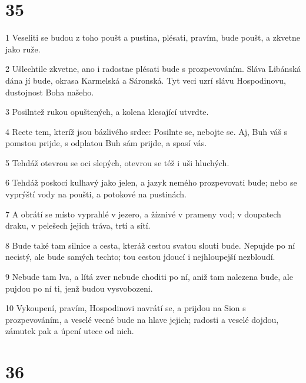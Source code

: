\chapter{35}

\par 1 Veseliti se budou z toho poušt a pustina, plésati, pravím, bude poušt, a zkvetne jako ruže.
\par 2 Ušlechtile zkvetne, ano i radostne plésati bude s prozpevováním. Sláva Libánská dána jí bude, okrasa Karmelská a Sáronská. Tyt veci uzrí slávu Hospodinovu, dustojnost Boha našeho.
\par 3 Posilntež rukou opuštených, a kolena klesající utvrdte.
\par 4 Rcete tem, kteríž jsou bázlivého srdce: Posilnte se, nebojte se. Aj, Buh váš s pomstou prijde, s odplatou Buh sám prijde, a spasí vás.
\par 5 Tehdáž otevrou se oci slepých, otevrou se též i uši hluchých.
\par 6 Tehdáž poskocí kulhavý jako jelen, a jazyk nemého prozpevovati bude; nebo se vyprýští vody na poušti, a potokové na pustinách.
\par 7 A obrátí se místo vyprahlé v jezero, a žíznivé v prameny vod; v doupatech draku, v pelešech jejich tráva, trtí a sítí.
\par 8 Bude také tam silnice a cesta, kteráž cestou svatou slouti bude. Nepujde po ní necistý, ale bude samých techto; tou cestou jdoucí i nejhloupejší nezbloudí.
\par 9 Nebude tam lva, a lítá zver nebude choditi po ní, aniž tam nalezena bude, ale pujdou po ní ti, jenž budou vysvobozeni.
\par 10 Vykoupení, pravím, Hospodinovi navrátí se, a prijdou na Sion s prozpevováním, a veselé vecné bude na hlave jejich; radosti a veselé dojdou, zámutek pak a úpení utece od nich.

\chapter{36}

